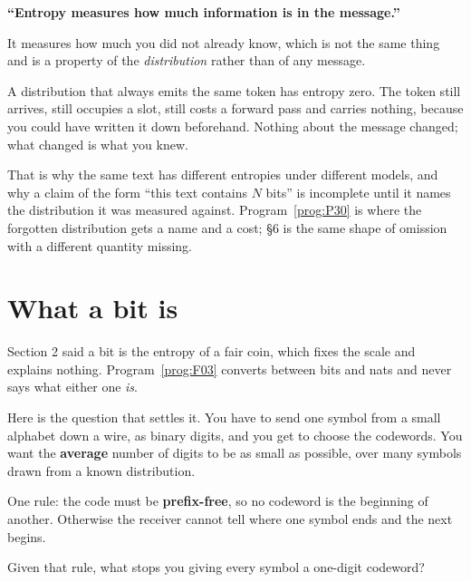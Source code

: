 \begin{fr}
\begin{trapbox}
\textbf{\enquote{Entropy measures how much information is in the message.}}

It measures how much you did not already know, which is not the same thing and
is a property of the \emph{distribution} rather than of any message.

A distribution that always emits the same token has entropy zero. The token
still arrives, still occupies a slot, still costs a forward pass \dash{} and
carries nothing, because you could have written it down beforehand. Nothing
about the message changed; what changed is what you knew.

That is why the same text has different entropies under different models, and
why a claim of the form \enquote{this text contains $N$ bits} is incomplete
until it names the distribution it was measured against.
Program~\ref{prog:P30} is where the forgotten distribution gets a name and a
cost; §6 is the same shape of omission with a different quantity missing.
\end{trapbox}
\end{fr}

\section{What a bit is}
\label{sec:P29-code}

\begin{fr}
Section 2 said a bit is the entropy of a fair coin, which fixes the scale and
explains nothing. Program~\ref{prog:F03} converts between bits and nats and
never says what either one \emph{is}.

Here is the question that settles it. You have to send one symbol from a small
alphabet down a wire, as binary digits, and you get to choose the codewords.
You want the \textbf{average} number of digits to be as small as possible,
over many symbols drawn from a known distribution.

One rule: the code must be \textbf{prefix-free}, so no codeword is the
beginning of another. Otherwise the receiver cannot tell where one symbol ends
and the next begins.

Given that rule, what stops you giving every symbol a one-digit codeword?
\dotline
\nextframe
\end{fr}

